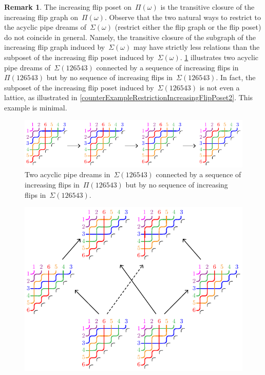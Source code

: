 \documentclass[reqno]{amsart}
\theoremstyle{definition}
\newtheorem{remark}[theorem]{Remark}
\newcommand{\pipeDreams}{\Pi} %
\newcommand{\acyclicPipeDreams}{\Sigma} %
\begin{document}
\begin{remark}
\label{rem:acyclicIncreasingFlipPosetNotLattice}
The increasing flip poset on~$\pipeDreams(\omega)$ is the transitive closure of the increasing flip graph on~$\pipeDreams(\omega)$.
Observe that the two natural ways to restrict to the acyclic pipe dreams of~$\acyclicPipeDreams(\omega)$ (restrict either the flip graph or the flip poset) do not coincide in general.
Namely, the transitive closure of the subgraph of the increasing flip graph induced by~$\acyclicPipeDreams(\omega)$ may have strictly less relations than the subposet of the increasing flip poset induced by~$\acyclicPipeDreams(\omega)$.
\cref{fig:counterExampleRestrictionIncreasingFlipPoset1} illustrates two acyclic pipe dreams of~$\acyclicPipeDreams(126543)$ connected by a sequence of increasing flips in~$\pipeDreams(126543)$ but by no sequence of increasing flips in~$\acyclicPipeDreams(126543)$.
In fact, the subposet of the increasing flip poset induced by~$\acyclicPipeDreams(126543)$ is not even a lattice, as illustrated in \cref{counterExampleRestrictionIncreasingFlipPoset2}.
This example is minimal.
%
%
\begin{figure}[ht]
	\centerline{\includegraphics[scale=1.1]{counterExampleRestrictionIncreasingFlipPoset1}}
	\caption{Two acyclic pipe dreams in~$\acyclicPipeDreams(126543)$ connected by a sequence of increasing flips in~$\pipeDreams(126543)$ but by no sequence of increasing flips in~$\acyclicPipeDreams(126543)$.}
	\label{fig:counterExampleRestrictionIncreasingFlipPoset1}
\end{figure}
%
\begin{figure}[ht]
	\centerline{\includegraphics[scale=1.1]{counterExampleRestrictionIncreasingFlipPoset2}}

\end{figure}
\end{remark}
\end{document}
